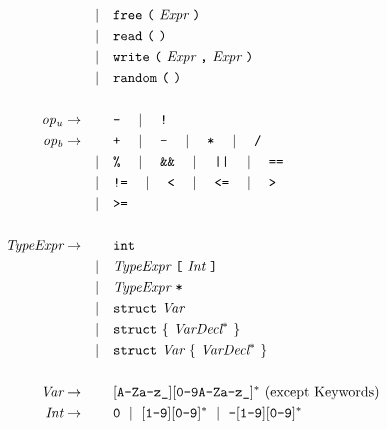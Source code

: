 \begin{align*}
                          &       & \SSmid  & \CCfree \ \CClparen \ \Expression \ \CCrparen \\
                          &       & \SSmid  & \CCread \ \CClparen \ \CCrparen \\
                          &       & \SSmid  & \CCwrite \ \CClparen \ \Expression \ \CCcomma \ \Expression \ \CCrparen \\
                          &       & \SSmid  & \CCrandom \ \CClparen \ \CCrparen \\
  \\  
  \UnaryOperator          & \SSra &         & \CCminus \SSmmid \CCnot \\
  \BinaryOperator         & \SSra &         & \CCplus \SSmmid \CCminus \SSmmid \CCasterisk \SSmmid \CCdiv \\
                          &       & \SSmid  & \CCmod \SSmmid \CCand \SSmmid \CCor \SSmmid \CCeqop \\
                          &       & \SSmid  & \CCne \SSmmid \CClt \SSmmid \CCle \SSmmid \CCgt \\
                          &       & \SSmid  & \CCge \\
  \\
  \TypeExpression         & \SSra &         & \CCint \\
                          &       & \SSmid  & \TypeExpression \ \CClsbracket \ \Integer \ \CCrsbracket \\
                          &       & \SSmid  & \TypeExpression \ \CCasterisk \\
                          &       & \SSmid  & \CCstruct \ \Variable \\
                          &       & \SSmid  & \CCstruct \ \CClbrace \ \VarDeclaration^* \ \CCrbrace \\
                          &       & \SSmid  & \CCstruct \ \Variable \ \CClbrace \ \VarDeclaration^* \ \CCrbrace \\
  \\
  \Variable               & \SSra &         & [\mbtt{A-Za-z\_}][\mbtt{0-9A-Za-z\_}]^* \ \mbox{(except Keywords)} \\
  \Integer                & \SSra &         & \mbtt{0} \ \mid \ [\mbtt{1-9}][\mbtt{0-9}]^* \ \mid \ \mbtt{-}[\mbtt{1-9}][\mbtt{0-9}]^* \\
\end{align*}